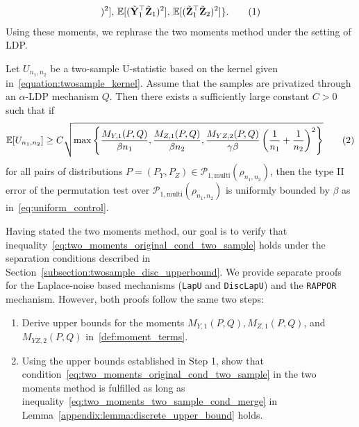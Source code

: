 \documentclass[twoside,11pt]{article}
\newcommand\numberthis{\addtocounter{equation}{1}\tag{\theequation}}
\newcommand{\rvTwo}{Y}
\newcommand{\rvThree}{Z}
\newcommand{\vectorize}[1]{\mathbf{#1}}
\newcommand{\private}[1]{\tilde{#1}}
\newcommand{\mE}{\mathbb{E}} %
\newcommand{\sampleSize}{n}
\newcommand{\kernelMoment}{M} %
\newcommand{\dataGenDist}{P}  %
\newcommand{\privacyMechanism}{Q}
\newcommand{\privacyParameter}{\alpha} %
\newcommand{\momentTwosampleVarCondexpY}{\kernelMoment_{\rvTwo,1}(\dataGenDist, \privacyMechanism)}
\newcommand{\momentTwosampleVarCondexpZ}{\kernelMoment_{\rvThree,1}(\dataGenDist, \privacyMechanism)}
\newcommand{\momentTwosampleExpSquare}{\kernelMoment_{\rvTwo \rvThree,2}(\dataGenDist, \privacyMechanism)}
\begin{document}
\begin{appendix}
\begin{align*}
		)^2
		], \, 
		\mE[
		(
		\private{\vectorize{\rvTwo}}_1^\top
		\private{\vectorize{\rvThree}}_1)^2], \,
		\mE[
		(
		\private{\vectorize{\rvThree}}_1^\top
		\private{\vectorize{\rvThree}}_2)^2
		]
		\}.
		\numberthis
		\label{def:moment_terms}
	\end{align*}
	\noindent
	Using these moments, we rephrase the two moments method under the setting of LDP. 
	\begin{lemma}\label{theorem:twosampleTwoMomentsMethod}
		Let $U_{\sampleSize_1,\sampleSize_2}$ be a two-sample U-statistic based on the kernel given in~\eqref{equation:twosample_kernel}.
		Assume that the samples are privatized through an $\privacyParameter$-LDP mechanism $\privacyMechanism$.
		Then there exists a sufficiently large constant $C > 0$ 
		such that if
		\begin{align*}
			\mE[U_{\sampleSize_1, \sampleSize_2}]
			\geq
			C
			\sqrt{
				\max
				\left\{
				\frac{ \momentTwosampleVarCondexpY }{\beta \sampleSize_1},
				\frac{ \momentTwosampleVarCondexpZ }{\beta \sampleSize_2},
				\frac{ \momentTwosampleExpSquare }{\gamma \beta}
				\left(
				\frac{1}{\sampleSize_1} + \frac{1}{\sampleSize_2}
				\right)^2
				\right\}
			}
			\numberthis \label{eq:two_moments_original_cond_two_sample}
		\end{align*}
		for all pairs of distributions $P = (P_{Y}, P_{Z}) \in \mathcal{P}_{1,\mathrm{multi}}(\rho_{\sampleSize_1,\sampleSize_2})$,	
		then the type II error of the permutation test over $\mathcal{P}_{1,\mathrm{multi}}(\rho_{\sampleSize_1,\sampleSize_2})$ is uniformly bounded by $\beta$ as in~\eqref{eq:uniform_control}.
	\end{lemma}
	
	\noindent
	Having stated the two moments method, our goal is to verify that inequality~\eqref{eq:two_moments_original_cond_two_sample} holds under the separation conditions described in Section~\ref{subsection:twosample_disc_upperbound}.
	We provide separate proofs for the Laplace-noise based mechanisms (\texttt{LapU} and \texttt{DiscLapU}) and the \texttt{RAPPOR} mechanism. However, both proofs follow the same two steps:
	\begin{enumerate}
		\item Derive upper bounds for the moments $\momentTwosampleVarCondexpY, \momentTwosampleVarCondexpZ$, and $\momentTwosampleExpSquare$ in~\eqref{def:moment_terms}.
		\item  Using the upper bounds established in Step 1,  show that condition~\eqref{eq:two_moments_original_cond_two_sample} in the two moments method is fulfilled as long as inequality~\eqref{eq:two_moments_two_sample_cond_merge} in Lemma~\ref{appendix:lemma:discrete_upper_bound} holds.
	\end{enumerate}
	

\end{appendix}
\end{document}
